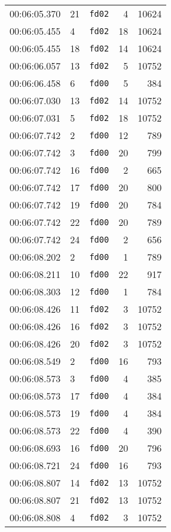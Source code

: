 \documentclass{article}
\begin{document}
\begin{longtable}{lllrr}
00:06:05.370 & 21 & \texttt{fd02} & 4 & 10624 \\
00:06:05.455 & 4 & \texttt{fd02} & 18 & 10624 \\
00:06:05.455 & 18 & \texttt{fd02} & 14 & 10624 \\
00:06:06.057 & 13 & \texttt{fd02} & 5 & 10752 \\
00:06:06.458 & 6 & \texttt{fd00} & 5 & 384 \\
00:06:07.030 & 13 & \texttt{fd02} & 14 & 10752 \\
00:06:07.031 & 5 & \texttt{fd02} & 18 & 10752 \\
00:06:07.742 & 2 & \texttt{fd00} & 12 & 789 \\
00:06:07.742 & 3 & \texttt{fd00} & 20 & 799 \\
00:06:07.742 & 16 & \texttt{fd00} & 2 & 665 \\
00:06:07.742 & 17 & \texttt{fd00} & 20 & 800 \\
00:06:07.742 & 19 & \texttt{fd00} & 20 & 784 \\
00:06:07.742 & 22 & \texttt{fd00} & 20 & 789 \\
00:06:07.742 & 24 & \texttt{fd00} & 2 & 656 \\
00:06:08.202 & 2 & \texttt{fd00} & 1 & 789 \\
00:06:08.211 & 10 & \texttt{fd00} & 22 & 917 \\
00:06:08.303 & 12 & \texttt{fd00} & 1 & 784 \\
00:06:08.426 & 11 & \texttt{fd02} & 3 & 10752 \\
00:06:08.426 & 16 & \texttt{fd02} & 3 & 10752 \\
00:06:08.426 & 20 & \texttt{fd02} & 3 & 10752 \\
00:06:08.549 & 2 & \texttt{fd00} & 16 & 793 \\
00:06:08.573 & 3 & \texttt{fd00} & 4 & 385 \\
00:06:08.573 & 17 & \texttt{fd00} & 4 & 384 \\
00:06:08.573 & 19 & \texttt{fd00} & 4 & 384 \\
00:06:08.573 & 22 & \texttt{fd00} & 4 & 390 \\
00:06:08.693 & 16 & \texttt{fd00} & 20 & 796 \\
00:06:08.721 & 24 & \texttt{fd00} & 16 & 793 \\
00:06:08.807 & 14 & \texttt{fd02} & 13 & 10752 \\
00:06:08.807 & 21 & \texttt{fd02} & 13 & 10752 \\
00:06:08.808 & 4 & \texttt{fd02} & 3 & 10752 \\

\end{longtable}
\end{document}
